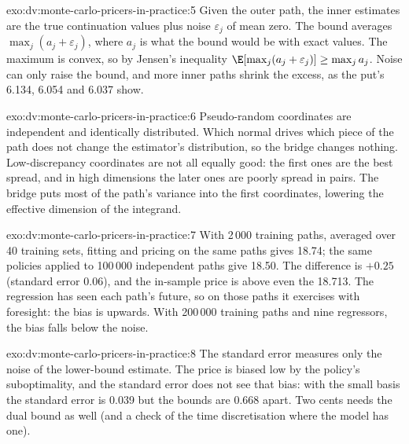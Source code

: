 \begin{solution}{exo:dv:monte-carlo-pricers-in-practice:5}
Given the outer path, the inner estimates are the true continuation values plus noise $\varepsilon_j$ of mean zero. The bound averages
$\max_j(a_j+\varepsilon_j)$, where $a_j$ is what the bound would be with exact values. The maximum is convex, so by Jensen's inequality
$\E[\max_j(a_j+\varepsilon_j)]\ge\max_j a_j$. Noise can only raise the bound, and more inner paths shrink the excess, as the put's
6.134, 6.054 and 6.037 show.
\end{solution}

\begin{solution}{exo:dv:monte-carlo-pricers-in-practice:6}
Pseudo-random coordinates are independent and identically distributed. Which normal drives which piece of the path does not change the estimator's
distribution, so the bridge changes nothing. Low-discrepancy coordinates are not all equally good: the first ones are the best spread, and in high
dimensions the later ones are poorly spread in pairs. The bridge puts most of the path's variance into the first coordinates, lowering the effective
dimension of the integrand.
\end{solution}

\begin{solution}{exo:dv:monte-carlo-pricers-in-practice:7}
With 2\,000 training paths, averaged over 40 training sets, fitting and pricing on the same paths gives 18.74; the same policies applied to 100\,000
independent paths give 18.50. The difference is $+0.25$ (standard error 0.06), and the in-sample price is above even the  18.713. The
regression has seen each path's future, so on those paths it exercises with foresight: the bias is upwards. With 200\,000 training paths and nine
regressors, the bias falls below the noise.
\end{solution}

\begin{solution}{exo:dv:monte-carlo-pricers-in-practice:8}
The standard error measures only the noise of the lower-bound estimate. The price is biased low by the policy's suboptimality, and the standard error
does not see that bias: with the small basis the standard error is 0.039 but the bounds are 0.668 apart. Two cents needs the dual bound as well (and a
check of the time discretisation where the model has one).
\end{solution}

